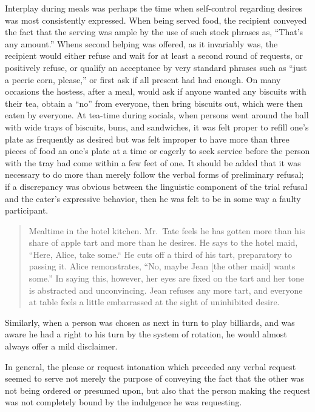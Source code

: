 \documentclass[twoside,symmetric,nobib,justified]{tufte-book}
\begin{document}
\newpage Interplay during meals was perhaps the time when self-control regarding
desires was most consistently expressed. When being served food, the
recipient conveyed the fact that the serving was ample by the use of
such stock phrases as, ``That's any amount.'' Whens second helping was
offered, as it invariably was, the recipient would either refuse and
wait for at least a second round of requests, or positively refuse, or
qualify an acceptance by very standard phrases such as ``just a peerie
corn, please,'' or first ask if all present had had enough. On many
occasions the hostess, after a meal, would ask if anyone wanted any
biscuits with their tea, obtain a ``no'' from everyone, then bring
biscuits out, which were then eaten by everyone. At tea-time during
socials, when persons went around the ball with wide trays of biscuits,
buns, and sandwiches, it was felt proper to refill one's plate as
frequently as desired but was felt improper to have more than three
pieces of food an one's plate at a time or eagerly to seek service
before the person with the tray had come within a few feet of one. It
should be added that it was necessary to do more than merely follow the
verbal forms of preliminary refusal; if a discrepancy was obvious
between the linguistic component of the trial refusal and the eater's
expressive behavior, then he was felt to be in some way a faulty
participant.

\begin{quote}
Mealtime in the hotel kitchen. Mr.~Tate feels he has gotten more than
his share of apple tart and more than he desires. He says to the hotel
maid, ``Here, Alice, take some.`` He cuts off a third of his tart,
preparatory to passing it. Alice remonstrates, ``No, maybe Jean {[}the
other maid{]} wants some.'' In saying this, however, her eyes are fixed
on the tart and her tone is abstracted and unconvincing. Jean refuses
any more tart, and everyone at table feels a little embarrassed at the
sight of uninhibited desire.
\end{quote}

\noindent Similarly, when a person was chosen as next in turn to play billiards,
and was aware he had a right to his turn by the system of rotation, he
would almost always offer a mild disclaimer.

In general, the please or request intonation which preceded any verbal
request seemed to serve not merely the purpose of conveying the fact
that the other was not being ordered or presumed upon, but also that the
person making the request was not completely bound by the indulgence he
was requesting.
\end{document}
